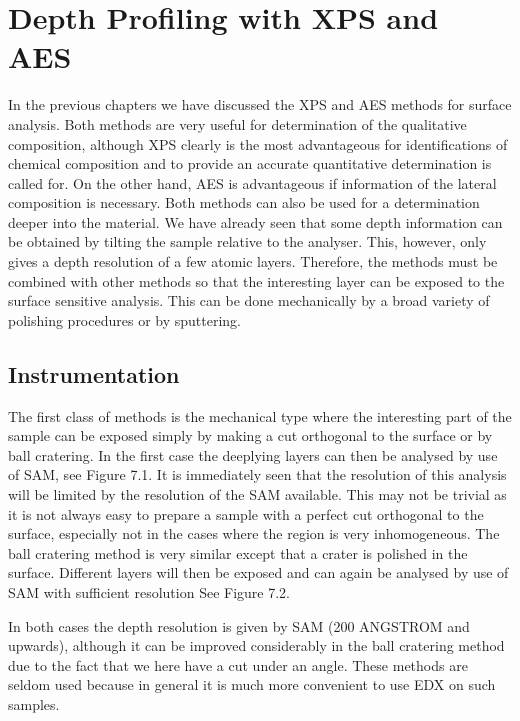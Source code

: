 \chapter{Depth Profiling with XPS and AES}
In the previous chapters we have discussed the XPS and AES methods for surface analysis. Both methods are very useful for determination of the qualitative composition, although XPS clearly is the most advantageous for identifications of chemical composition and to provide an accurate quantitative determination is called for. On the other hand, AES is advantageous if information of the lateral composition is necessary. Both methods can also be used for a determination deeper into the material. We have already seen that some depth information can be obtained by tilting the sample relative to the analyser. This, however, only gives a depth resolution of a few atomic layers. Therefore, the methods must be combined with other methods so that the interesting layer can be exposed to the surface sensitive analysis. This can be done mechanically by a broad variety of polishing procedures or by sputtering.

\section{Instrumentation}
The first class of methods is the mechanical type where the interesting part of the sample can be exposed simply by making a cut orthogonal to the surface or by ball cratering. In the first case the deeplying layers can then be analysed by use of SAM, see Figure 7.1. It is immediately seen that the resolution of this analysis will be limited by the resolution of the SAM available. This may not be trivial as it is not always easy to prepare a sample with a perfect cut orthogonal to the surface, especially not in the cases where the region is very inhomogeneous. The ball cratering method is very similar except that a crater is polished in the surface. Different layers will then be exposed and can again be analysed by use of SAM with sufficient resolution See Figure 7.2.

In both cases the depth resolution is given by SAM (200 ANGSTROM and upwards), although it can be improved considerably in the ball cratering method due to the fact that we here have a cut under an angle. These methods are seldom used because in general it is much more convenient to use EDX on such samples.\\

 \vspace{1cm}

